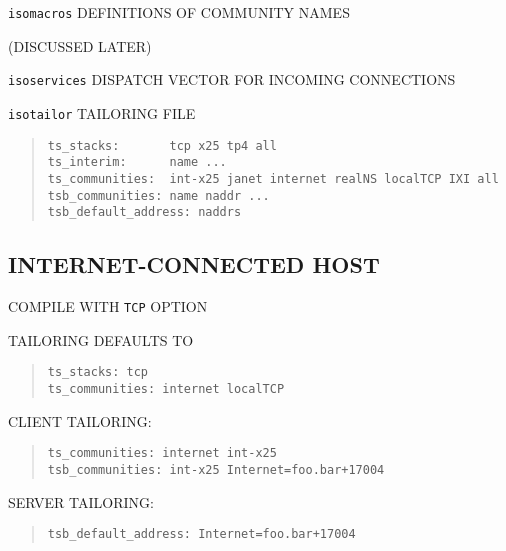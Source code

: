 \begin{bwslide}

\begin{nrtc}
\item	\verb"isomacros" DEFINITIONS OF COMMUNITY NAMES
    \begin{nrtc}
    \item	(DISCUSSED LATER)
    \end{nrtc}

\item	\verb"isoservices" DISPATCH VECTOR FOR INCOMING CONNECTIONS

\item	\verb"isotailor" TAILORING FILE
\begin{quote}\small\begin{verbatim}
ts_stacks:       tcp x25 tp4 all
ts_interim:      name ...
ts_communities:  int-x25 janet internet realNS localTCP IXI all
tsb_communities: name naddr ...
tsb_default_address: naddrs
\end{verbatim}\end{quote}
\end{nrtc}
\end{bwslide}


\begin{bwslide}
\part*	{INTERNET-CONNECTED HOST}\bf

\begin{nrtc}
\item	COMPILE WITH \verb"TCP" OPTION

\item	TAILORING DEFAULTS TO
\begin{quote}\small\begin{verbatim}
ts_stacks: tcp
ts_communities: internet localTCP
\end{verbatim}\end{quote}
\end{nrtc}
\end{bwslide}


\begin{bwslide}

\begin{nrtc}
\item	CLIENT TAILORING:
\begin{quote}\small\begin{verbatim}
ts_communities: internet int-x25
tsb_communities: int-x25 Internet=foo.bar+17004
\end{verbatim}\end{quote}

\item	SERVER TAILORING:
\begin{quote}\small\begin{verbatim}
tsb_default_address: Internet=foo.bar+17004
\end{verbatim}\end{quote}
\end{nrtc}
\end{bwslide}


